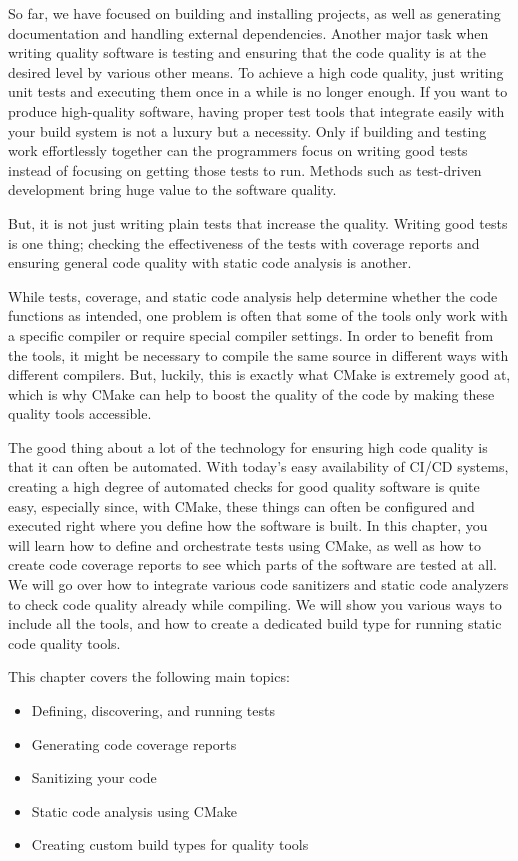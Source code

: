 So far, we have focused on building and installing projects, as well as generating documentation and handling external dependencies. Another major task when writing quality software is testing and ensuring that the code quality is at the desired level by various other means. To achieve a high code quality, just writing unit tests and executing them once in a while is no longer enough. If you want to produce high-quality software, having proper test tools that integrate easily with your build system is not a luxury but a necessity. Only if building and testing work effortlessly together can the programmers focus on writing good tests instead of focusing on getting those tests to run. Methods
such as test-driven development bring huge value to the software quality.

But, it is not just writing plain tests that increase the quality. Writing good tests is one thing; checking the effectiveness of the tests with coverage reports and ensuring general code quality with static code analysis is another.

While tests, coverage, and static code analysis help determine whether the code functions as intended, one problem is often that some of the tools only work with a specific compiler or require special compiler settings. In order to benefit from the tools, it might be necessary to compile the same source in different ways with different compilers. But, luckily, this is exactly what CMake is extremely good at, which is why CMake can help to boost the quality of the code by making these quality tools accessible.

The good thing about a lot of the technology for ensuring high code quality is that it can often be automated. With today's easy availability of CI/CD systems, creating a high degree of automated checks for good quality software is quite easy, especially since, with CMake, these things can often be configured and executed right where you define how the software is built. In this chapter, you will learn how to define and orchestrate tests using CMake, as well as how to create code coverage reports to see which parts of the software are tested at all. We will go over how to integrate various code sanitizers and static code analyzers to check code quality already while compiling. We will show you various ways to include all the tools, and how to create a dedicated build type for running static code quality tools.

This chapter covers the following main topics:

\begin{itemize}
\item 
Defining, discovering, and running tests

\item 
Generating code coverage reports

\item 
Sanitizing your code

\item 
Static code analysis using CMake

\item 
Creating custom build types for quality tools
\end{itemize}
















